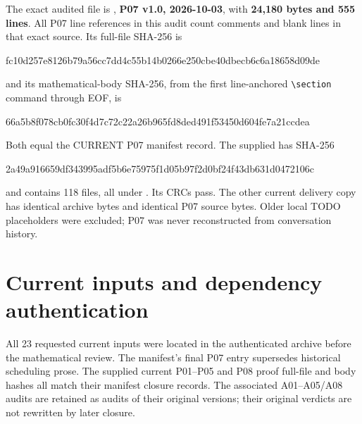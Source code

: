 \documentclass[11pt]{article}
\newcommand{\sha}[2]{\par{\small\ttfamily #1\allowbreak #2}\par}
\begin{document}
The exact audited file is
, \textbf{P07 v1.0,
2026-10-03}, with \textbf{24,180 bytes and 555 lines}. All P07 line references
in this audit count comments and blank lines in that exact source. Its
full-file SHA-256 is
\sha{fc10d257e8126b79a56cc7dd4c55b14b}{0266e250cbe40dbecb6c6a18658d09de}
and its mathematical-body SHA-256, from the first line-anchored
\verb|\section| command through EOF, is
\sha{66a5b8f078cb0fc30f4d7c72c22a26b9}{65fd8ded491f53450d604fe7a21ccdea}
Both equal the CURRENT P07 manifest record. The supplied
 has SHA-256
\sha{2a49a916659df343995adf5b6e75975f}{1d05b97f2d0bf24f43db631d0472106c}
and contains 118 files, all under .
Its CRCs pass. The other current delivery copy has identical archive
bytes and identical P07 source bytes. Older local TODO placeholders were
excluded; P07 was never reconstructed from conversation history.

\section{Current inputs and dependency authentication}
\label{sec:inputs}
All 23 requested current inputs were located in the authenticated archive
before the mathematical review. The manifest's final P07 entry supersedes
historical scheduling prose. The supplied current P01--P05 and P08 proof
full-file and body hashes all match their manifest closure records.
The associated A01--A05/A08 audits are retained as audits of their original
versions; their original verdicts are not rewritten by later closure.
\end{document}
